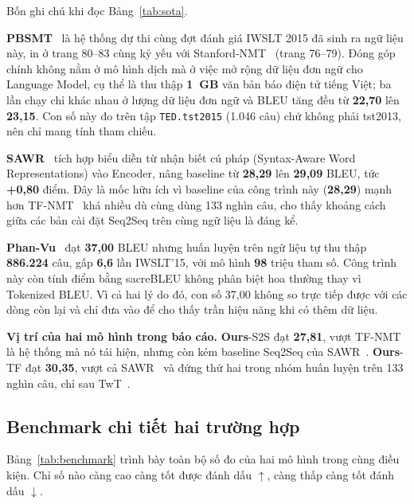 \documentclass[11pt,a4paper]{article}
\newcommand{\file}[1]{\texttt{\small #1}}
\newcommand{\ours}{\textbf{Ours}}
\begin{document}
Bốn ghi chú khi đọc Bảng~\ref{tab:sota}.

\textbf{PBSMT}~\cite{tran2015} là hệ thống dự thi cùng đợt đánh giá IWSLT 2015
đã sinh ra ngữ liệu này, in ở trang 80--83 cùng kỷ yếu với
Stanford-NMT~\cite{luong2015iwslt} (trang 76--79). Đóng góp chính không nằm ở mô
hình dịch mà ở việc mở rộng dữ liệu đơn ngữ cho Language Model, cụ thể là thu
thập \textbf{1~GB} văn bản báo điện tử tiếng Việt; ba lần chạy chỉ khác nhau ở
lượng dữ liệu đơn ngữ và BLEU tăng đều từ \textbf{22,70} lên \textbf{23,15}. Con
số này đo trên tập \file{TED.tst2015} (1.046 câu) chứ không phải tst2013, nên
chỉ mang tính tham chiếu.

\textbf{SAWR}~\cite{zhang2019} tích hợp biểu diễn từ nhận biết cú pháp
(Syntax-Aware Word Representations) vào Encoder, nâng baseline từ \textbf{28,29}
lên \textbf{29,09} BLEU, tức \textbf{+0,80} điểm. Đây là mốc hữu ích vì baseline
của công trình này (\textbf{28,29}) mạnh hơn TF-NMT~\cite{tfnmt} khá nhiều dù
cùng dùng 133 nghìn câu, cho thấy khoảng cách giữa các bản cài đặt Seq2Seq trên
cùng ngữ liệu là đáng kể.

\textbf{Phan-Vu}~\cite{phanvu2019} đạt \textbf{37,00} BLEU nhưng huấn luyện trên
ngữ liệu tự thu thập \textbf{886.224} câu, gấp \textbf{6,6} lần IWSLT'15, với mô
hình \textbf{98} triệu tham số. Công trình này còn tính điểm bằng sacreBLEU
không phân biệt hoa thường thay vì Tokenized BLEU. Vì cả hai lý do đó, con số
37,00 không so trực tiếp được với các dòng còn lại và chỉ đưa vào để cho thấy
trần hiệu năng khi có thêm dữ liệu.

\textbf{Vị trí của hai mô hình trong báo cáo.} \ours{}-S2S đạt \textbf{27,81},
vượt TF-NMT~\cite{tfnmt} là hệ thống mà nó tái hiện, nhưng còn kém baseline
Seq2Seq của SAWR~\cite{zhang2019}. \ours{}-TF đạt \textbf{30,35}, vượt cả
SAWR~\cite{zhang2019} và đứng thứ hai trong nhóm huấn luyện trên 133 nghìn câu,
chỉ sau TwT~\cite{nguyen2019}.

\subsection{Benchmark chi tiết hai trường hợp}

Bảng~\ref{tab:benchmark} trình bày toàn bộ số đo của hai mô hình trong cùng điều
kiện. Chỉ số nào càng cao càng tốt được đánh dấu $\uparrow$, càng thấp càng tốt
đánh dấu $\downarrow$.
\end{document}
